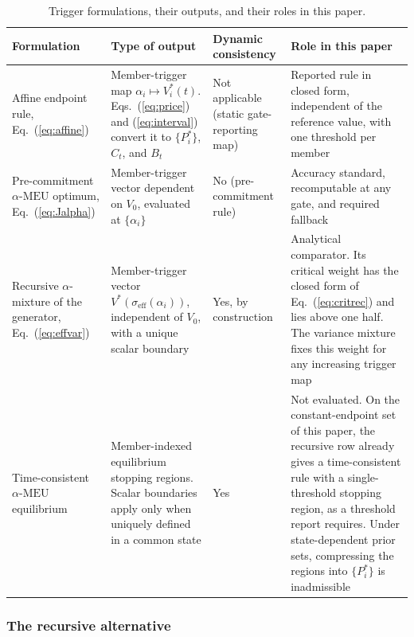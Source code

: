 \documentclass[5p,times,authoryear]{elsarticle}
\theoremstyle{plain}
\newcommand{\aMEU}{\alpha\text{-MEU}}
\begin{document}
\begin{table}[!t]
\caption{Trigger formulations, their outputs, and their roles in this paper.}
\label{tab:formulations}
\centering
\footnotesize
\renewcommand{\arraystretch}{1.15}
\begin{tabular}{@{}L{0.17\textwidth}L{0.25\textwidth}L{0.14\textwidth}L{0.36\textwidth}@{}}
\toprule
Formulation & Type of output & Dynamic consistency & Role in this paper\\
\midrule
Affine endpoint rule, Eq.~(\ref{eq:affine}) & Member-trigger map $\alpha_i\mapsto V^{*}_{i}(t)$. Eqs.~(\ref{eq:price}) and (\ref{eq:interval}) convert it to $\{P^{*}_{i}\}$, $C_t$, and $B_t$ & Not applicable (static gate-reporting map) & Reported rule in closed form, independent of the reference value, with one threshold per member\\
Pre-commitment $\aMEU$ optimum, Eq.~(\ref{eq:Jalpha}) & Member-trigger vector dependent on $V_0$, evaluated at $\{\alpha_i\}$ & No (pre-commitment rule) & Accuracy standard, recomputable at any gate, and required fallback\\
Recursive $\alpha$-mixture of the generator, Eq.~(\ref{eq:effvar}) & Member-trigger vector $V^{*}(\sigma_{\mathrm{eff}}(\alpha_i))$, independent of $V_0$, with a unique scalar boundary & Yes, by construction & Analytical comparator. Its critical weight has the closed form of Eq.~(\ref{eq:critrec}) and lies above one half. The variance mixture fixes this weight for any increasing trigger map\\
Time-consistent $\aMEU$ equilibrium \citep{HuangYu2021} & Member-indexed equilibrium stopping regions. Scalar boundaries apply only when uniquely defined in a common state & Yes & Not evaluated. On the constant-endpoint set of this paper, the recursive row already gives a time-consistent rule with a single-threshold stopping region, as a threshold report requires. Under state-dependent prior sets, compressing the regions into $\{P^{*}_{i}\}$ is inadmissible\\
\bottomrule
\end{tabular}
\end{table}

\subsubsection{The recursive alternative}
\end{document}
